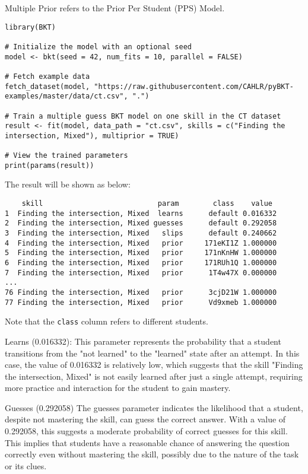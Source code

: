 \documentclass{article}
\begin{document}
Multiple Prior refers to the Prior Per Student (PPS) Model.

\begin{lstlisting}[caption={R code to train a PPS BKT model}]
library(BKT)

# Initialize the model with an optional seed
model <- bkt(seed = 42, num_fits = 10, parallel = FALSE)

# Fetch example data
fetch_dataset(model, "https://raw.githubusercontent.com/CAHLR/pyBKT-examples/master/data/ct.csv", ".")

# Train a multiple guess BKT model on one skill in the CT dataset
result <- fit(model, data_path = "ct.csv", skills = c("Finding the intersection, Mixed"), multiprior = TRUE)

# View the trained parameters
print(params(result))
\end{lstlisting}

The result will be shown as below:

\begin{verbatim}
    skill                           param        class    value
1  Finding the intersection, Mixed  learns      default 0.016332
2  Finding the intersection, Mixed guesses      default 0.292058
3  Finding the intersection, Mixed   slips      default 0.240662
4  Finding the intersection, Mixed   prior     171eKI1Z 1.000000
5  Finding the intersection, Mixed   prior     171nKnHW 1.000000
6  Finding the intersection, Mixed   prior     171RUh1Q 1.000000
7  Finding the intersection, Mixed   prior      1T4w47X 0.000000
...
76 Finding the intersection, Mixed   prior      3cjD21W 1.000000
77 Finding the intersection, Mixed   prior      Vd9xmeb 1.000000
\end{verbatim}
    
Note that the \texttt{class} column refers to different students.

Learns (0.016332): This parameter represents the probability that a student transitions from the "not learned" to the "learned" state after an attempt. In this case, the value of 0.016332 is relatively low, which suggests that the skill "Finding the intersection, Mixed" is not easily learned after just a single attempt, requiring more practice and interaction for the student to gain mastery.

Guesses (0.292058) The guesses parameter indicates the likelihood that a student, despite not mastering the skill, can guess the correct answer. With a value of 0.292058, this suggests a moderate probability of correct guesses for this skill. This implies that students have a reasonable chance of answering the question correctly even without mastering the skill, possibly due to the nature of the task or its clues.
\end{document}
